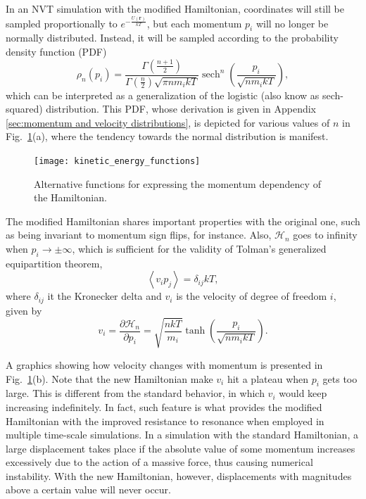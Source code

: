 \documentclass[
aip,
jcp,
reprint,
]{revtex4-1}
\DeclareMathOperator\sech{sech}
\newcommand{\vt}[1]{\boldsymbol{\mathbf{#1}}}          %
\newcommand{\diff}[2]{\frac{\partial #2}{\partial #1}} %
\begin{document}
In an NVT simulation with the modified Hamiltonian, coordinates will still be sampled proportionally to $e^{-\frac{U(\vt r)}{kT}}$, but each momentum $p_i$ will no longer be normally distributed.
Instead, it will be sampled according to the probability density function (PDF)
\begin{equation}
\label{eq:momentum distribution}
\rho_n(p_i) = \frac{\Gamma\left(\frac{n+1}{2}\right)}{\Gamma\left(\frac{n}{2}\right) \sqrt{\pi n m_i k T}} \sech^n\left(\frac{p_i}{\sqrt{n m_i k T}}\right),
\end{equation}
which can be interpreted as a generalization of the logistic (also know as sech-squared) distribution.
This PDF, whose derivation is given in Appendix \ref{sec:momentum and velocity distributions}, is depicted for various values of $n$ in Fig.~\ref{fig:hamiltonian momentum dependency}(a), where the tendency towards the normal distribution is manifest.

\begin{figure}
	\centering
	\texttt{[image: kinetic\_energy\_functions]}
	\caption{Alternative functions for expressing the momentum dependency of the Hamiltonian.}
	\label{fig:hamiltonian momentum dependency}
\end{figure}

The modified Hamiltonian shares important properties with the original one, such as being invariant to momentum sign flips, for instance.
Also, $\mathcal{H}_n$ goes to infinity when $p_i \to \pm \infty$, which is sufficient \cite{Uline_2008} for the validity of Tolman's generalized equipartition theorem,
\begin{equation}
\label{eq:generalized equipartition}
\left\langle v_i p_j \right\rangle = \delta_{ij} k T,
\end{equation}
where $\delta_{ij}$ it the Kronecker delta and $v_i$ is the velocity of degree of freedom $i$, given by 
\begin{equation}
\label{eq:velocity definition}
v_i = \diff{p_i}{{\mathcal H}_n} = \sqrt{\frac{n k T}{m_i}} \tanh\left(\frac{p_i}{\sqrt{n m_i k T}}\right).
\end{equation}

A graphics showing how velocity changes with momentum is presented in Fig.~\ref{fig:hamiltonian momentum dependency}(b).
Note that the new Hamiltonian make $v_i$ hit a plateau when $p_i$ gets too large.
This is different from the standard behavior, in which $v_i$ would keep increasing indefinitely.
In fact, such feature is what provides the modified Hamiltonian with the improved resistance to resonance when employed in multiple time-scale simulations.
In a simulation with the standard Hamiltonian, a large displacement takes place if the absolute value of some momentum increases excessively due to the action of a massive force, thus causing numerical instability.
With the new Hamiltonian, however, displacements with magnitudes above a certain value will never occur.
\end{document}
